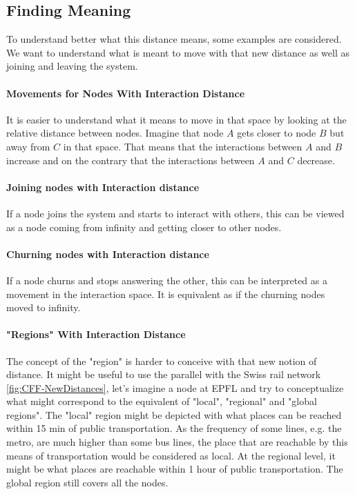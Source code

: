 \documentclass[a4paper,11pt,twoside=semi,openright]{report}
\begin{document}
\subsection{Finding Meaning}
To understand better what this distance means, some examples are
considered. We want to understand what is meant to move with that new distance as
well as joining and leaving the system. 

\paragraph{Movements for Nodes With Interaction Distance}
It is easier to understand what it means to move in that space by looking at
the relative distance between nodes. Imagine that node $A$ gets closer to node
$B$ but away from $C$ in that space. That means that the interactions between
$A$ and $B$ increase and on the contrary that the interactions between $A$ and
$C$ decrease.

\paragraph{Joining nodes with Interaction distance}
If a node joins the system and starts to interact with others, this can be
viewed as a node coming from infinity and getting closer to other
nodes.

\paragraph{Churning nodes with Interaction distance}
If a node churns and stops answering the other, this can be interpreted as a
movement in the interaction space. It is equivalent as if the churning nodes moved
to infinity.  

\paragraph{"Regions" With Interaction Distance} \label{par:section-example}
The concept of the "region" is harder to conceive with that new notion of
distance. It might be useful to use the parallel with the Swiss rail network
\autoref{fig:CFF-NewDistances}, let's imagine a node at EPFL and try to
conceptualize what might correspond to the equivalent of "local", "regional" and "global regions". The "local" region might be depicted with what places can
be reached within 15 min of public transportation. As the frequency of some lines, e.g. the metro, are much higher than some bus lines, the place that are reachable by this means of transportation would be considered as local. At the regional level, it might be what
places are reachable within 1 hour of public transportation. The global region still
covers all the nodes.
\end{document}

